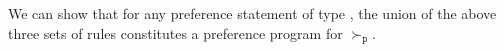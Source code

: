 We can show that for any preference statement  of type , 
the union of the above three sets of rules constitutes a preference program for $\succ_\mathtt{p}$.

%
%
